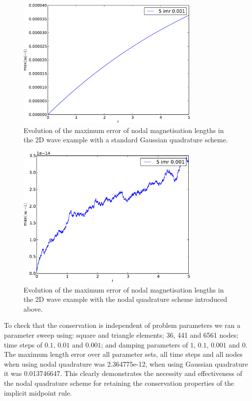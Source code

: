 \begin{figure}
  \centering
  \includegraphics[width=0.8\textwidth]{plots/2d_wave_solution_m_length/gauss-maxmathbfm-1vst.pdf}
  \caption{Evolution of the maximum error of nodal magnetisation lengths in the 2D wave example with a standard Gaussian quadrature scheme.}
  \label{fig:mean-ml-error-2d-gauss}
\end{figure}

\begin{figure}
  \centering
  \includegraphics[width=0.8\textwidth]{plots/2d_wave_solution_m_length/lnodal-maxmathbfm-1vst.pdf}
  \caption{Evolution of the maximum error of nodal magnetisation lengths in the 2D wave example with the nodal quadrature scheme introduced above.}
  \label{fig:mean-ml-error-2d-nodal}
\end{figure}

To check that the conservation is independent of problem parameters we ran a parameter sweep using: square and triangle elements; 36, 441 and 6561 nodes; time steps of $0.1$, $0.01$ and $0.001$; and damping parameters of $1$, $0.1$, $0.001$ and $0$.
The maximum length error over all parameter sets, all time steps and all nodes when using nodal quadrature was 2.364775e-12, when using Gaussian quadrature it was 0.013746647.
This clearly demonstrates the necessity and effectiveness of the nodal quadrature scheme for retaining the conservation properties of the implicit midpoint rule.


